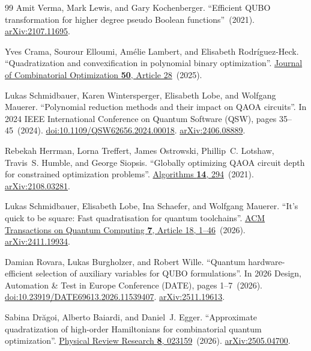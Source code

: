 \documentclass[a4paper,onecolumn,11pt,unpublished]{quantumarticle}
\theoremstyle{remark}
\begin{document}
\begin{thebibliography}{99}
Amit Verma, Mark Lewis, and Gary Kochenberger.
\newblock ``Efficient QUBO transformation for higher degree pseudo Boolean functions''~(2021).
\newblock \href{http://arxiv.org/abs/2107.11695}{arXiv:2107.11695}.

Yves Crama, Sourour Elloumi, Am{\'e}lie Lambert, and Elisabeth Rodr{\'i}guez-Heck.
\newblock ``Quadratization and convexification in polynomial binary optimization''.
\newblock \href{https://dx.doi.org/10.1007/s10878-025-01334-y}{Journal of Combinatorial Optimization {\bf 50}, Article 28}~(2025).

Lukas Schmidbauer, Karen Wintersperger, Elisabeth Lobe, and Wolfgang Mauerer.
\newblock ``Polynomial reduction methods and their impact on QAOA circuits''.
\newblock In 2024 IEEE International Conference on Quantum Software (QSW), pages 35--45~(2024).
\newblock \href{https://dx.doi.org/10.1109/QSW62656.2024.00018}{doi:10.1109/QSW62656.2024.00018}.
\newblock \href{http://arxiv.org/abs/2406.08889}{arXiv:2406.08889}.

Rebekah Herrman, Lorna Treffert, James Ostrowski, Phillip~C. Lotshaw, Travis~S. Humble, and George Siopsis.
\newblock ``Globally optimizing QAOA circuit depth for constrained optimization problems''.
\newblock \href{https://dx.doi.org/10.3390/a14100294}{Algorithms {\bf 14}, 294}~(2021).
\newblock \href{http://arxiv.org/abs/2108.03281}{arXiv:2108.03281}.

Lukas Schmidbauer, Elisabeth Lobe, Ina Schaefer, and Wolfgang Mauerer.
\newblock ``It's quick to be square: Fast quadratisation for quantum toolchains''.
\newblock \href{https://dx.doi.org/10.1145/3800943}{ACM Transactions on Quantum Computing {\bf 7}, Article 18, 1--46}~(2026).
\newblock \href{http://arxiv.org/abs/2411.19934}{arXiv:2411.19934}.

Damian Rovara, Lukas Burgholzer, and Robert Wille.
\newblock ``Quantum hardware-efficient selection of auxiliary variables for QUBO formulations''.
\newblock In 2026 Design, Automation \& Test in Europe Conference (DATE), pages 1--7~(2026).
\newblock \href{https://dx.doi.org/10.23919/DATE69613.2026.11539407}{doi:10.23919/DATE69613.2026.11539407}.
\newblock \href{http://arxiv.org/abs/2511.19613}{arXiv:2511.19613}.

Sabina Dr{\u a}goi, Alberto Baiardi, and Daniel~J. Egger.
\newblock ``Approximate quadratization of high-order Hamiltonians for combinatorial quantum optimization''.
\newblock \href{https://dx.doi.org/10.1103/9rc4-vj11}{Physical Review Research {\bf 8}, 023159}~(2026).
\newblock \href{http://arxiv.org/abs/2505.04700}{arXiv:2505.04700}.


\end{thebibliography}
\end{document}
